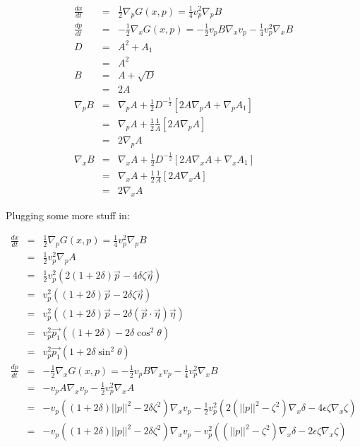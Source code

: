 \documentclass[12pt]{article}
\begin{document}
\begin{eqnarray}
\frac{dx}{dt}   &=&  \frac{1}{2}\nabla_p G(x,p) =  \frac{1}{4}v_p^2\nabla_pB\\
\frac{dp}{dt}   &=& -\frac{1}{2}\nabla_x G(x,p) = -\frac{1}{2}v_pB\nabla_xv_p-\frac{1}{4}v_p^2\nabla_xB\\
D               &=&  A^2+A_1\\
                &=&  A^2\\
B               &=&  A+\sqrt{D}\\
                &=&  2A\\
\nabla_p B      &=&  \nabla_p A+\frac{1}{2}D^{-\frac{1}{2}}\left[2A\nabla_p A + \nabla_p A_1\right]\\
                &=&  \nabla_p A+\frac{1}{2}\frac{1}{A}\left[2A\nabla_p A\right]\\
                &=&  2\nabla_p A\\
\nabla_x B      &=&  \nabla_x A+\frac{1}{2}D^{-\frac{1}{2}}\left[2A\nabla_x A + \nabla_x A_1\right]\\
                &=&  \nabla_x A+\frac{1}{2}\frac{1}{A}\left[2A\nabla_x A\right]\\
                &=&  2\nabla_x A
\end{eqnarray}

Plugging some more stuff in:

\begin{eqnarray}
\frac{dx}{dt}   &=&  \frac{1}{2}\nabla_p G(x,p) =  \frac{1}{4}v_p^2\nabla_pB\\
                &=&  \frac{1}{2}v_p^2\nabla_p A\\
                &=&  \frac{1}{2}v_p^2(2(1+2\delta)\vec{p}-4\delta\zeta\vec{\eta})\\
                &=&  v_p^2((1+2\delta)\vec{p}-2\delta\zeta\vec{\eta})\\
                &=&  v_p^2((1+2\delta)\vec{p}-2\delta(\vec{p}\cdot\vec{\eta})\vec{\eta})\\
                &=&  v_p^2\vec{p_1}((1+2\delta)-2\delta\cos^2\theta)\\
                &=&  v_p^2\vec{p_1}(1+2\delta\sin^2\theta)\\
\frac{dp}{dt}   &=& -\frac{1}{2}\nabla_x G(x,p) = -\frac{1}{2}v_pB\nabla_xv_p-\frac{1}{4}v_p^2\nabla_xB\\
                &=& -v_p A \nabla_xv_p - \frac{1}{2}v_p^2\nabla_xA\\
                &=& -v_p ((1+2\delta)||p||^2-2\delta\zeta^2) \nabla_xv_p - \frac{1}{2}v_p^2(2(||p||^2-\zeta^2)\nabla_x \delta - 4\epsilon\zeta\nabla_x \zeta) \nonumber\\
                &=& -v_p ((1+2\delta)||p||^2-2\delta\zeta^2) \nabla_xv_p - v_p^2((||p||^2-\zeta^2)\nabla_x \delta - 2\epsilon\zeta\nabla_x \zeta) \nonumber
\end{eqnarray}
\end{document}

